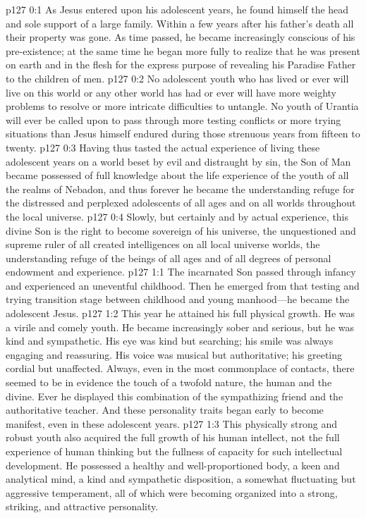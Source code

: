 \author{Midwayer Commission}
\vs p127 0:1 As Jesus entered upon his adolescent years, he found himself the head and sole support of a large family. Within a few years after his father’s death all their property was gone. As time passed, he became increasingly conscious of his pre\hyp{}existence; at the same time he began more fully to realize that he was present on earth and in the flesh for the express purpose of revealing his Paradise Father to the children of men.\plusone
\vs p127 0:2 No adolescent youth who has lived or ever will live on this world or any other world has had or ever will have more weighty problems to resolve or more intricate difficulties to untangle. No youth of Urantia will ever be called upon to pass through more testing conflicts or more trying situations than Jesus himself endured during those strenuous years from fifteen to twenty.
\vs p127 0:3 Having thus tasted the actual experience of living these adolescent years on a world beset by evil and distraught by sin, the Son of Man became possessed of full knowledge about the life experience of the youth of all the realms of Nebadon, and thus forever he became the understanding refuge for the distressed and perplexed adolescents of all ages and on all worlds throughout the local universe.
\vs p127 0:4 Slowly, but certainly and by actual experience, this divine Son is  the right to become sovereign of his universe, the unquestioned and supreme ruler of all created intelligences on all local universe worlds, the understanding refuge of the beings of all ages and of all degrees of personal endowment and experience.
\vs p127 1:1 The incarnated Son passed through infancy and experienced an uneventful childhood. Then he emerged from that testing and trying transition stage between childhood and young manhood---he became the adolescent Jesus.
\vs p127 1:2 This year he attained his full physical growth. He was a virile and comely youth. He became increasingly sober and serious, but he was kind and sympathetic. His eye was kind but searching; his smile was always engaging and reassuring. His voice was musical but authoritative; his greeting cordial but unaffected. Always, even in the most commonplace of contacts, there seemed to be in evidence the touch of a twofold nature, the human and the divine. Ever he displayed this combination of the sympathizing friend and the authoritative teacher. And these personality traits began early to become manifest, even in these adolescent years.
\vs p127 1:3 This physically strong and robust youth also acquired the full growth of his human intellect, not the full experience of human thinking but the fullness of capacity for such intellectual development. He possessed a healthy and well\hyp{}proportioned body, a keen and analytical mind, a kind and sympathetic disposition, a somewhat fluctuating but aggressive temperament, all of which were becoming organized into a strong, striking, and attractive personality.
